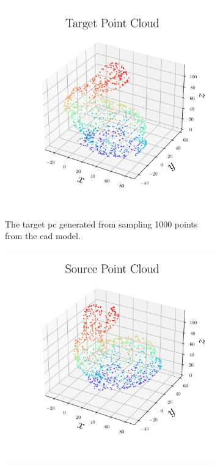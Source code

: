 \begin{figure}[!h]
	\centering
	\begin{subfigure}[b]{0.48\textwidth}
		\centering
		\includegraphics[width=\textwidth]{chapters/2-pose-estimation/fig/synthetic_pc_target.png}
		\caption{The target \gls{pc} generated from sampling \num{1000} points from the \gls{cad} model.}
		\label{fig:synthetic-source-data}
	\end{subfigure}
	\hfill
	\begin{subfigure}[b]{0.48\textwidth}
		\centering
		\includegraphics[width=\textwidth]{chapters/2-pose-estimation/fig/synthetic_pc_source.png}

\end{subfigure}
\end{figure}

